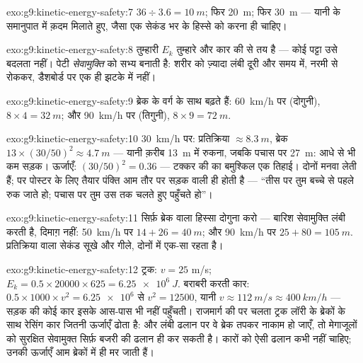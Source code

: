 \begin{solution}{exo:g9:kinetic-energy-safety:7}
$36 \div 3.6 = \qty{10}{m}$; फिर \qty{20}{m}; फिर \qty{30}{m} ---
यानी  के समानुपात में क़दम मिलाते हुए, जैसा एक सेकंड भर के हिस्से को
करना ही चाहिए।
\end{solution}

\begin{solution}{exo:g9:kinetic-energy-safety:8}
तुम्हारी $E_k$ तुम्हारे  और कार की  से तय है --- कोई पट्टा
उसे बदलता नहीं। पेटी \emph{सेवामुक्ति} को सभ्य बनाती है: शरीर को
ज़्यादा लंबी दूरी और समय में, नरमी से रोककर, डैशबोर्ड पर एक ही झटके में
नहीं।
\end{solution}

\begin{solution}{exo:g9:kinetic-energy-safety:9}
ब्रेक  के वर्ग के साथ बढ़ते हैं: \qty{60}{km/h} पर (दोगुनी),
$8 \times 4 = \qty{32}{m}$; और \qty{90}{km/h} पर (तिगुनी),
$8 \times 9 = \qty{72}{m}$.
\end{solution}

\begin{solution}{exo:g9:kinetic-energy-safety:10}
\qty{30}{km/h} पर: प्रतिक्रिया $\approx \qty{8.3}{m}$, ब्रेक
$13 \times (30/50)^2 \approx \qty{4.7}{m}$ --- यानी क़रीब \qty{13}{m}
में रुकना, जबकि पचास पर \qty{27}{m}: आधे से भी कम सड़क। ऊर्जाएँ:
$(30/50)^2 = 0.36$ --- टक्कर की  का बमुश्किल एक तिहाई। दोनों
मनवा लेती हैं; पर पोस्टर के लिए तैयार पंक्ति आम तौर पर सड़क वाली ही
होती है --- ``तीस पर तुम बच्चे से पहले रुक जाते हो; पचास पर तुम उस तक
चलते हुए पहुँचते हो''।
\end{solution}

\begin{solution}{exo:g9:kinetic-energy-safety:11}
सिर्फ़ ब्रेक वाला हिस्सा दोगुना करो --- बारिश सेवामुक्ति लंबी करती है,
दिमाग़ नहीं: \qty{50}{km/h} पर $14 + 26 = \qty{40}{m}$; और
\qty{90}{km/h} पर $25 + 80 = \qty{105}{m}$. प्रतिक्रिया वाला सेकंड
सूखे और गीले, दोनों में एक-सा रहता है।
\end{solution}

\begin{solution}{exo:g9:kinetic-energy-safety:12}
ट्रक: $v = 25$ \unit{m/s}; $E_k = 0.5 \times 20000 \times 625 =
\qty{6.25e6}{J}$. बराबरी करती कार: $0.5 \times 1000 \times v^2 =
\num{6.25e6}$ से $v^2 = 12500$, यानी $v \approx \qty{112}{m/s}
\approx \qty{400}{km/h}$ --- सड़क की कोई कार इसके आस-पास भी नहीं
पहुँचती। राजमार्ग की  पर चलता ट्रक लॉरी के ब्रेकों के साथ रेसिंग कार
जितनी ऊर्जाएँ ढोता है: और लंबी ढलान पर वे ब्रेक तपकर नाकाम हो जाएँ, तो
मेगाजूलों को सुरक्षित सेवामुक्त सिर्फ़ बजरी की ढलान ही कर सकती है।
कारों को ऐसी ढलान कभी नहीं चाहिए; उनकी ऊर्जाएँ आम ब्रेकों में ही मर
जाती हैं।
\end{solution}

